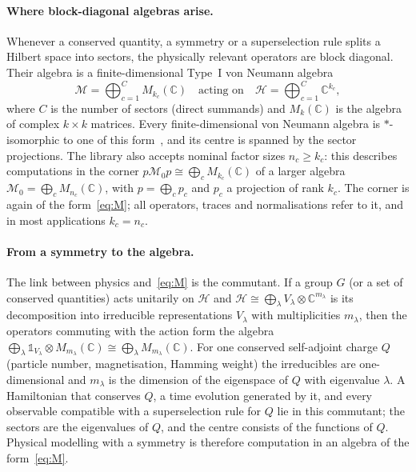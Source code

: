 \documentclass[11pt]{article}
\newcommand{\C}{\mathbb{C}}
\newcommand{\M}{\mathcal{M}}
\begin{document}
\paragraph{Where block-diagonal algebras arise.} Whenever a conserved quantity, a symmetry or a superselection
rule splits a Hilbert space into sectors, the physically relevant operators are block diagonal. Their algebra
is a finite-dimensional Type~I von Neumann algebra
\begin{equation}\label{eq:M}
  \M=\bigoplus_{c=1}^{C}M_{k_c}(\C)\quad\text{acting on}\quad\mathcal H=\bigoplus_{c=1}^C\C^{k_c},
\end{equation}
where $C$ is the number of sectors (direct summands) and $M_{k}(\C)$ is the algebra of complex $k\times k$
matrices. Every finite-dimensional von Neumann algebra is $*$-isomorphic to one of this form~\cite{takesaki2002}, and its centre is
spanned by the sector projections. The library also accepts nominal factor sizes $n_c\ge k_c$: this describes
computations in the corner $p\M_0p\cong\bigoplus_cM_{k_c}(\C)$ of a larger algebra $\M_0=\bigoplus_cM_{n_c}(\C)$,
with $p=\bigoplus_cp_c$ and $p_c$ a projection of rank $k_c$. The corner is again of the form~\eqref{eq:M}; all
operators, traces and normalisations refer to it, and in most applications $k_c=n_c$.
\paragraph{From a symmetry to the algebra.} The link between physics and~\eqref{eq:M} is the commutant. If a group
$G$ (or a set of conserved quantities) acts unitarily on $\mathcal H$ and $\mathcal H\cong\bigoplus_\lambda
V_\lambda\otimes\C^{m_\lambda}$ is its decomposition into irreducible representations $V_\lambda$ with
multiplicities $m_\lambda$, then the operators commuting with the action form the algebra
$\bigoplus_\lambda \mathbb 1_{V_\lambda}\otimes M_{m_\lambda}(\C)\cong\bigoplus_\lambda M_{m_\lambda}(\C)$. For one
conserved self-adjoint charge $Q$ (particle number, magnetisation, Hamming weight) the irreducibles are
one-dimensional and $m_\lambda$ is the dimension of the eigenspace of $Q$ with eigenvalue $\lambda$. A Hamiltonian
that conserves $Q$, a time evolution generated by it, and every observable compatible with a superselection rule
for $Q$ lie in this commutant; the sectors are the eigenvalues of $Q$, and the centre consists of the functions
of $Q$. Physical modelling with a symmetry is therefore computation in an algebra of the form~\eqref{eq:M}.
\end{document}
